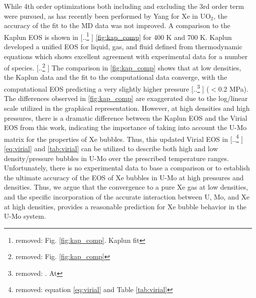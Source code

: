 \documentclass[review]{elsarticle}
\providecommand{\DIFaddtex}[1]{{\protect\color{blue} \sf #1}} %
\providecommand{\DIFdeltex}[1]{{\protect\color{red} [..\footnote{removed: #1} ]}} %
\providecommand{\DIFaddbegin}{} %
\providecommand{\DIFaddend}{} %
\providecommand{\DIFdelbegin}{} %
\providecommand{\DIFdelend}{} %
\providecommand{\DIFadd}[1]{\texorpdfstring{\DIFaddtex{#1}}{#1}} %
\providecommand{\DIFdel}[1]{\texorpdfstring{\DIFdeltex{#1}}{}} %
\newcommand{\DIFscaledelfig}{0.5}
\newlength{\DIFdelgraphicswidth} %
\newlength{\DIFdelgraphicsheight} %
\newcommand{\DIFaddincludegraphics}[2][]{{\color{blue}\fbox{\DIFOincludegraphics[#1]{#2}}}} %
\newcommand{\DIFdelincludegraphics}[2][]{%
\sbox{\DIFdelgraphicsbox}{\DIFOincludegraphics[#1]{#2}}%
\settoboxwidth{\DIFdelgraphicswidth}{\DIFdelgraphicsbox} %
\settoboxtotalheight{\DIFdelgraphicsheight}{\DIFdelgraphicsbox} %
\scalebox{\DIFscaledelfig}{%
\parbox[b]{\DIFdelgraphicswidth}{\usebox{\DIFdelgraphicsbox}\\[-\baselineskip] \rule{\DIFdelgraphicswidth}{0em}}\llap{\resizebox{\DIFdelgraphicswidth}{\DIFdelgraphicsheight}{%
\setlength{\unitlength}{\DIFdelgraphicswidth}%
\begin{picture}(1,1)%
\thicklines\linethickness{2pt} %
{\color[rgb]{1,0,0}\put(0,0){\framebox(1,1){}}}%
{\color[rgb]{1,0,0}\put(0,0){\line( 1,1){1}}}%
{\color[rgb]{1,0,0}\put(0,1){\line(1,-1){1}}}%
\end{picture}%
}\hspace*{3pt}}} %
} %
\DeclareRobustCommand{\DIFaddbegin}{\DIFOaddbegin \let\includegraphics\DIFaddincludegraphics} %
\DeclareRobustCommand{\DIFaddend}{\DIFOaddend \let\includegraphics\DIFOincludegraphics} %
\DeclareRobustCommand{\DIFdelbegin}{\DIFOdelbegin \let\includegraphics\DIFdelincludegraphics} %
\DeclareRobustCommand{\DIFdelend}{\DIFOaddend \let\includegraphics\DIFOincludegraphics} %
\begin{document}
While 4th order optimizations both including and excluding the 3rd order term were pursued, as has recently been performed by Yang \cite{yang2022} for Xe in UO$_2$, the accuracy of the fit to the MD data was not improved. A comparison to the Kaplun EOS \cite{Kaplun2003} is shown in \DIFdelbegin \DIFdel{Fig. \ref{fig:kap_comp}. Kaplun fit }\DIFdelend \DIFaddbegin \DIFadd{\cref{fig:kap_comp} for 400 K and 700 K. Kaplun developed }\DIFaddend a unified EOS for liquid, gas, and fluid defined from thermodynamic equations which shows excellent agreement with experimental data for a number of species. \DIFdelbegin \DIFdel{Fig. \ref{fig:kap_comp} }\DIFdelend \DIFaddbegin \DIFadd{The comparison in \cref{fig:kap_comp} }\DIFaddend shows that at low densities, the Kaplun data and the fit to the computational data converge, with the computational EOS predicting a very slightly higher pressure \DIFdelbegin \DIFdel{. At }\DIFdelend \DIFaddbegin \DIFadd{($<$0.2 MPa). The differences observed in \cref{fig:kap_comp} are exaggerated due to the log/linear scale utilized in the graphical representation. However, at }\DIFaddend high densities and high pressures, there is a dramatic difference between the Kaplun EOS and the Virial EOS from this work, indicating the importance of taking into account the U-Mo matrix for the properties of Xe bubbles. Thus, this updated Virial EOS in \DIFdelbegin \DIFdel{equation \ref{eq:virial} and Table \ref{tab:virial} }\DIFdelend \DIFaddbegin \DIFadd{\cref{eq:virial} and \cref{tab:virial} }\DIFaddend can be utilized to describe both high and low density/pressure bubbles in U-Mo over the prescribed temperature ranges. \DIFaddbegin \DIFadd{Unfortunately, there is no experimental data to base a comparison or to establish the ultimate accuracy of the EOS of Xe bubbles in U-Mo at high pressures and densities. Thus, we argue that the convergence to a pure Xe gas at low densities, and the specific incorporation of the accurate interaction between U, Mo, and Xe at high densities, provides a reasonable prediction for Xe bubble behavior in the U-Mo system. 
}\DIFaddend 
\end{document}
